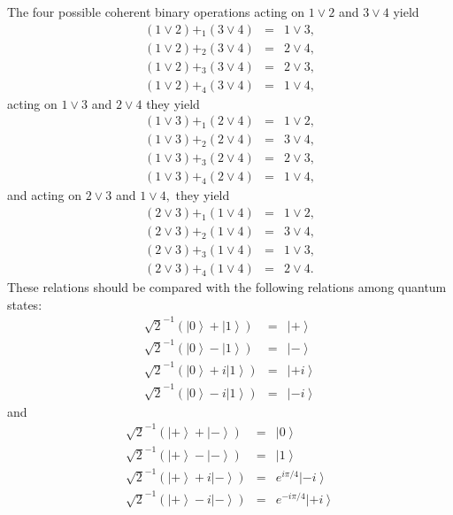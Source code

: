 \documentclass[pra,nofootinbib,showpacs,12pt]{revtex4}
\begin{document}
The four possible coherent binary operations acting on $1\vee 2$ and $3\vee
4 $ yield
\begin{eqnarray}
(1\vee 2)+_{\text{1}}(3\vee 4) &=&1\vee 3,  \label{bo1} \\
(1\vee 2)+_{\text{2}}(3\vee 4) &=&2\vee 4,  \label{bo2} \\
(1\vee 2)+_{\text{3}}(3\vee 4) &=&2\vee 3,  \label{bo3} \\
(1\vee 2)+_{\text{4}}(3\vee 4) &=&1\vee 4,  \label{bo4}
\end{eqnarray}
acting on $1\vee 3$ and $2\vee 4$ they yield
\begin{eqnarray}
(1\vee 3)+_{\text{1}}(2\vee 4) &=&1\vee 2,  \label{bo5} \\
(1\vee 3)+_{\text{2}}(2\vee 4) &=&3\vee 4,  \label{bo6} \\
(1\vee 3)+_{\text{3}}(2\vee 4) &=&2\vee 3,  \label{bo7} \\
(1\vee 3)+_{\text{4}}(2\vee 4) &=&1\vee 4,  \label{bo8}
\end{eqnarray}
and acting on $2\vee 3$ and $1\vee 4,$ they yield
\begin{eqnarray}
(2\vee 3)+_{\text{1}}(1\vee 4) &=&1\vee 2,  \label{bo9} \\
(2\vee 3)+_{\text{2}}(1\vee 4) &=&3\vee 4,  \label{bo10} \\
(2\vee 3)+_{\text{3}}(1\vee 4) &=&1\vee 3,  \label{bo11} \\
(2\vee 3)+_{\text{4}}(1\vee 4) &=&2\vee 4.  \label{bo12}
\end{eqnarray}
These relations should be compared with the following relations among
quantum states:
\begin{eqnarray}
\sqrt{2}^{-1}\left( \left| 0\right\rangle +\left| 1\right\rangle \right)
&=&\left| +\right\rangle  \label{cs1} \\
\sqrt{2}^{-1}\left( \left| 0\right\rangle -\left| 1\right\rangle \right)
&=&\left| -\right\rangle  \label{cs2} \\
\sqrt{2}^{-1}\left( \left| 0\right\rangle +i\left| 1\right\rangle \right)
&=&\left| +i\right\rangle  \label{cs3} \\
\sqrt{2}^{-1}\left( \left| 0\right\rangle -i\left| 1\right\rangle \right)
&=&\left| -i\right\rangle  \label{cs4}
\end{eqnarray}
and
\begin{eqnarray}
\sqrt{2}^{-1}\left( \left| +\right\rangle +\left| -\right\rangle \right)
&=&\left| 0\right\rangle  \label{cs5} \\
\sqrt{2}^{-1}\left( \left| +\right\rangle -\left| -\right\rangle \right)
&=&\left| 1\right\rangle  \label{cs6} \\
\sqrt{2}^{-1}\left( \left| +\right\rangle +i\left| -\right\rangle \right)
&=&e^{i\pi /4}\left| -i\right\rangle  \label{cs7} \\
\sqrt{2}^{-1}\left( \left| +\right\rangle -i\left| -\right\rangle \right)
&=&e^{-i\pi /4}\left| +i\right\rangle  \label{cs8}
\end{eqnarray}
\end{document}
